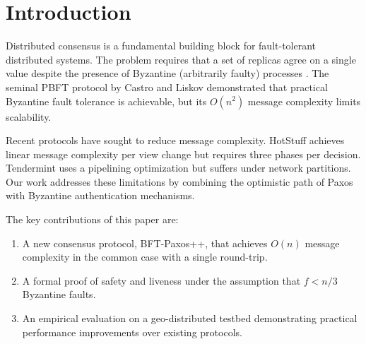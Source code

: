 \documentclass[
    language=english,
    doctype=conference-paper,
    institution=none,
]{../../omnilatex}
\begin{document}
\maketitle

\begin{abstract}
This paper presents a novel approach to distributed consensus in Byzantine fault-tolerant systems.
Our protocol, BFT-Paxos++, achieves consensus in $O(n)$ message complexity under normal conditions
while maintaining safety and liveness guarantees even when up to $f < n/3$ nodes are Byzantine faulty.
We evaluate our approach on a geo-distributed testbed spanning three continents and demonstrate
a 42\% improvement in commit latency compared to state-of-the-art protocols such as HotStuff
and Tendermint. Our results show that BFT-Paxos++ scales effectively to 64-node clusters with
sub-second commit times, making it suitable for production blockchain and distributed ledger
applications.
\end{abstract}

\section{Introduction}
\label{sec:introduction}

Distributed consensus is a fundamental building block for fault-tolerant distributed systems.
The problem requires that a set of replicas agree on a single value despite the presence of
Byzantine (arbitrarily faulty) processes \cite{lamport1982byzantine}. The seminal PBFT protocol
by Castro and Liskov \cite{castro1999practical} demonstrated that practical Byzantine fault
tolerance is achievable, but its $O(n^2)$ message complexity limits scalability.

Recent protocols have sought to reduce message complexity. HotStuff \cite{yin2019hotstuff}
achieves linear message complexity per view change but requires three phases per decision.
Tendermint \cite{buchman2018tendermint} uses a pipelining optimization but suffers under
network partitions. Our work addresses these limitations by combining the optimistic path
of Paxos with Byzantine authentication mechanisms.

The key contributions of this paper are:
\begin{enumerate}
    \item A new consensus protocol, BFT-Paxos++, that achieves $O(n)$ message complexity
          in the common case with a single round-trip.
    \item A formal proof of safety and liveness under the assumption that $f < n/3$ Byzantine
          faults.
    \item An empirical evaluation on a geo-distributed testbed demonstrating practical performance
          improvements over existing protocols.
\end{enumerate}
\end{document}
